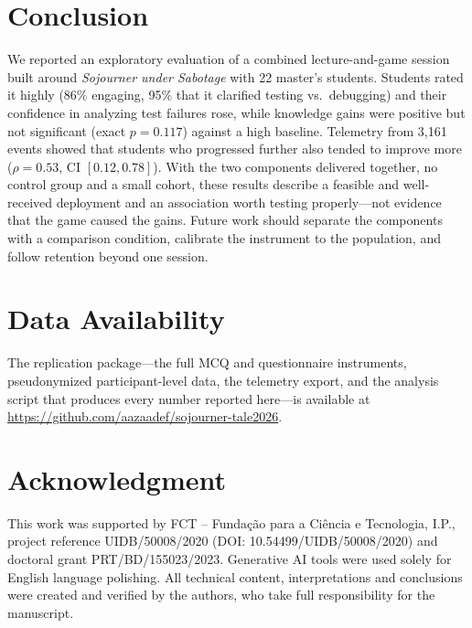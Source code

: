 \documentclass[conference]{IEEEtran}
\begin{document}
\section{Conclusion}
\label{sec:conclusion}

We reported an exploratory evaluation of a combined lecture-and-game session built around \emph{Sojourner under Sabotage} with 22 master's students. Students rated it highly (86\% engaging, 95\% that it clarified testing vs.\ debugging) and their confidence in analyzing test failures rose, while knowledge gains were positive but not significant (exact $p = 0.117$) against a high baseline. Telemetry from 3,161 events showed that students who progressed further also tended to improve more ($\rho = 0.53$, CI $[0.12, 0.78]$).
With the two components delivered together, no control group and a small cohort, these results describe a feasible and well-received deployment and an association worth testing properly---not evidence that the game caused the gains. Future work should separate the components with a comparison condition, calibrate the instrument to the population, and follow retention beyond one session.

\section*{Data Availability}
The replication package---the full MCQ and questionnaire instruments, pseudonymized participant-level data, the telemetry export, and the analysis script that produces every number reported here---is available at \url{https://github.com/aazaadef/sojourner-tale2026}.

\section*{Acknowledgment}
This work was supported by FCT -- Funda\c{c}\~{a}o para a Ci\^{e}ncia e Tecnologia, I.P., project reference UIDB/50008/2020 (DOI: 10.54499/UIDB/50008/2020) and doctoral grant PRT/BD/155023/2023.
Generative AI tools were used solely for English language polishing. All technical content, interpretations and conclusions were created and verified by the authors, who take full responsibility for the manuscript.
\end{document}
